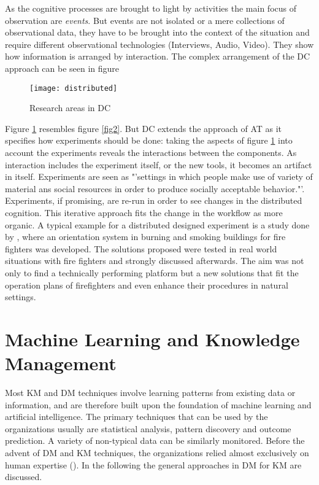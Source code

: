 As the cognitive processes are brought to light by activities the main focus of observation are \textit{events}. But events are not isolated or a mere collections of observational data, they have to be brought into the context of the situation and require different observational technologies (Interviews, Audio, Video). They show how information is arranged by interaction. The complex arrangement of the \ac{DC} approach can be seen in figure

\begin{figure}[ht]
	\centering
  \texttt{[image: distributed]}
	\caption{Research areas in \ac{DC}}
	\label{fig4}
\end{figure}

Figure \ref{fig4} resembles figure \ref{fig2}. But \ac{DC} extends the approach of \ac{AT} as it specifies how experiments should be done: taking the aspects of figure \ref{fig4} into account the experiments reveals the interactions between the components. As interaction includes the experiment itself, or the new tools, it becomes an artifact in itself. Experiments are seen as "'settings in which people make use of variety of material ans social resources in order to produce socially acceptable behavior."'. Experiments, if promising, are re-run in order to see changes in the distributed cognition. This iterative approach fits the change in the workflow as more organic. A typical example for a distributed designed experiment is a study done by \cite{denef2008handy}, where an orientation system in burning and smoking buildings for fire fighters was developed. The solutions proposed were tested in real world situations with fire fighters and strongly discussed afterwards. The aim was not only to find a technically performing platform but a new solutions that fit the operation plans of firefighters and even enhance their procedures in natural settings.

\section{Machine Learning and Knowledge Management}
Most KM and \ac{DM} techniques involve learning patterns from existing data or information, and are therefore built upon the foundation of machine learning and artificial intelligence. The primary techniques that can be used by the organizations usually are statistical analysis, pattern discovery and outcome prediction. A variety of non-typical data can be similarly monitored. Before the advent of \acs{DM} and \acs{KM} techniques, the organizations relied almost exclusively on human expertise (\cite{tsai2012knowledge}). In the following the general approaches in \acs{DM} for \acs{KM} are discussed.


